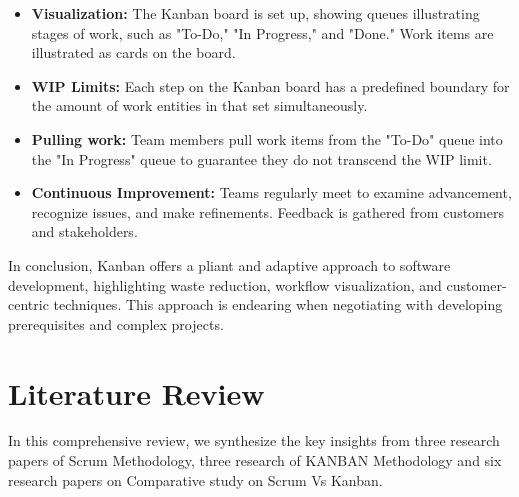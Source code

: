 \documentclass[conference]{IEEEtran}
\begin{document}
\begin{itemize}
\item \textbf{Visualization:} The Kanban board is set up, showing queues illustrating stages of work, such as "To-Do," "In Progress," and "Done." Work items are illustrated as cards on the board\cite{ikonen2010leadership}.

\item \textbf{WIP Limits:} Each step on the Kanban board has a predefined boundary for the amount of work entities in that set simultaneously\cite{al2015kanban}.

\item \textbf{Pulling work:} Team members pull work items from the "To-Do" queue into the "In Progress" queue to guarantee they do not transcend the WIP limit\cite{al2015kanban}.

\item \textbf{Continuous Improvement:} Teams regularly meet to examine advancement, recognize issues, and make refinements. Feedback is gathered from customers and stakeholders\cite{ikonen2011impact}.
\end{itemize}

In conclusion, Kanban offers a pliant and adaptive approach to software development, highlighting waste reduction, workflow visualization, and customer-centric techniques. This approach is endearing when negotiating with developing prerequisites and complex projects\cite{corona2013review}.


\section{Literature Review}
In this comprehensive review, we synthesize the key insights from three research papers of Scrum Methodology, three research of KANBAN Methodology and six research papers on Comparative study on Scrum Vs Kanban.
\end{document}
